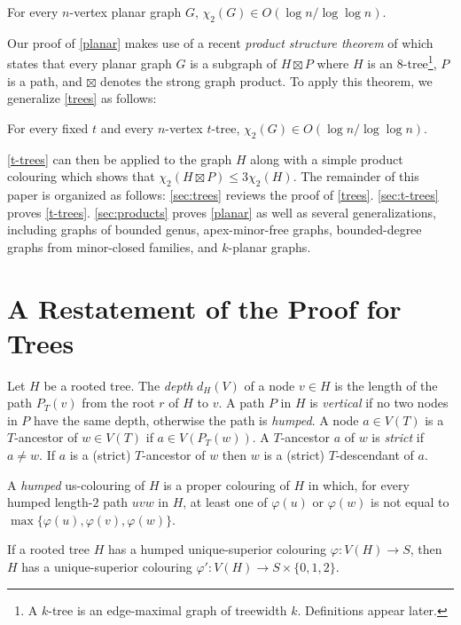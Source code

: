 \documentclass[kpfonts]{patmorin}
\newcommand{\uqs}{\chi_2}
\begin{document}
\begin{thm}\label{planar}
    For every $n$-vertex planar graph $G$, $\uqs(G)\in O(\log n/\log\log n)$.
\end{thm}

Our proof of \cref{planar} makes use of a recent \emph{product structure theorem} of \citet{dujmovic.joret.ea:planar} which states that every planar graph $G$ is a subgraph of $H\boxtimes P$ where $H$ is an $8$-tree\footnote{A $k$-tree is an edge-maximal graph of treewidth $k$. Definitions appear later.}, $P$ is a path, and $\boxtimes$ denotes the strong graph product.  To apply this theorem, we generalize \cref{trees} as follows:

\begin{thm}\label{t-trees}
    For every fixed $t$ and every $n$-vertex $t$-tree, $\uqs(G) \in O(\log n/\log\log n)$.
\end{thm}

\cref{t-trees} can then be applied to the graph $H$ along with a simple product colouring which shows that $\uqs(H\boxtimes P)\le 3\uqs(H)$.  The remainder of this paper is organized as follows: \cref{sec:trees} reviews the proof of \cref{trees}. \cref{sec:t-trees} proves \cref{t-trees}.  \cref{sec:products} proves \cref{planar} as well as several generalizations, including graphs of bounded genus, apex-minor-free graphs, bounded-degree graphs from minor-closed families, and $k$-planar graphs.




\section{A Restatement of the Proof for Trees}

Let $H$ be a rooted tree.  The \emph{depth} $d_H(V)$ of a node $v\in H$ is the length of the path $P_T(v)$ from the root $r$ of $H$ to $v$.  A path $P$ in $H$ is \emph{vertical} if no two nodes in $P$ have the same depth, otherwise the path is \emph{humped}.  A node $a\in V(T)$ is a $T$-ancestor of $w\in V(T)$ if $a\in V(P_T(w))$.  A $T$-ancestor $a$ of $w$ is \emph{strict} if $a\neq w$.  If $a$ is a (strict) $T$-ancestor of $w$ then $w$ is a (strict) $T$-descendant of $a$.

A \emph{humped} us-colouring of $H$ is a proper colouring of $H$ in which, for every humped length-$2$ path $uvw$ in $H$, at least one of $\varphi(u)$ or $\varphi(w)$ is not equal to $\max\{\varphi(u),\varphi(v),\varphi(w)\}$.

\begin{lem}\label{product}
    If a rooted tree $H$ has a humped unique-superior colouring $\varphi:V(H)\to S$, then $H$ has a unique-superior colouring $\varphi':V(H)\to S\times\{0,1,2\}$.
\end{lem}
\end{document}
